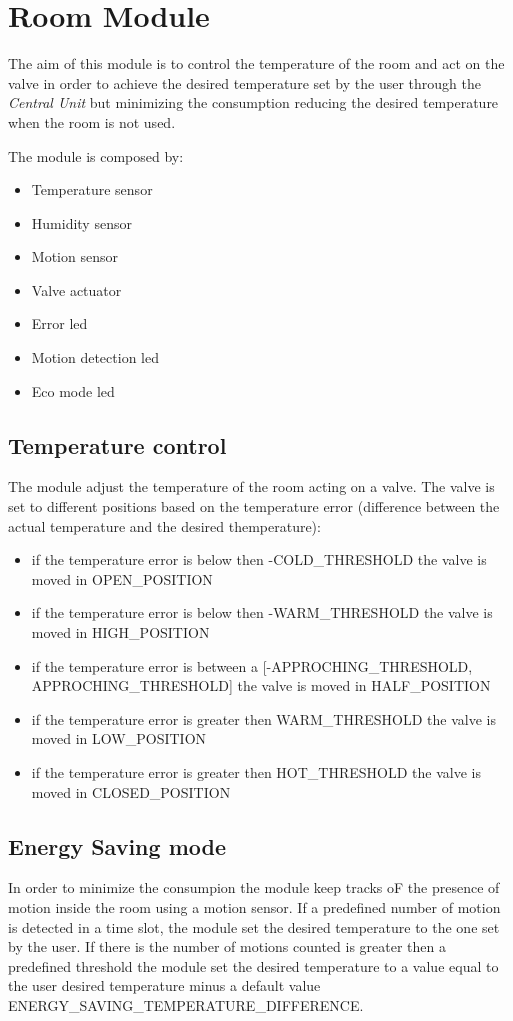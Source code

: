 \section{Room Module}
The aim of this module is to control the temperature of the room and act on the valve in order to 
achieve the desired temperature set by the user through the \textit{Central Unit} but minimizing the consumption
reducing the desired temperature when the room is not used.
\newline

The module is composed by:
\begin{itemize}
	\item Temperature sensor
	\item Humidity sensor
	\item Motion sensor
	\item Valve actuator
	\item Error led
	\item Motion detection led
	\item Eco mode led
\end{itemize}

\subsection{Temperature control}
The module adjust the temperature of the room acting on a valve.
The valve is set to different positions based on the temperature error (difference between the actual temperature and the desired themperature):
\begin{itemize}
	\item if the temperature error is below then -COLD\_THRESHOLD the valve is moved in OPEN\_POSITION
	\item if the temperature error is below then -WARM\_THRESHOLD the valve is moved in HIGH\_POSITION
	\item if the temperature error is between a [-APPROCHING\_THRESHOLD, APPROCHING\_THRESHOLD] the valve is moved in HALF\_POSITION
	\item if the temperature error is greater then WARM\_THRESHOLD the valve is moved in LOW\_POSITION
	\item if the temperature error is greater then HOT\_THRESHOLD the valve is moved in CLOSED\_POSITION
\end{itemize}

\subsection{Energy Saving mode}
In order to minimize the consumpion the module keep tracks oF the presence of motion inside the room
using a motion sensor.
If a predefined number of motion is detected in a time slot, the module set the desired temperature to the one set by the user.
If there is the number of motions counted is greater then a predefined threshold the module set the desired temperature 
to a value equal to the user desired temperature minus a default value ENERGY\_SAVING\_TEMPERATURE\_DIFFERENCE.

